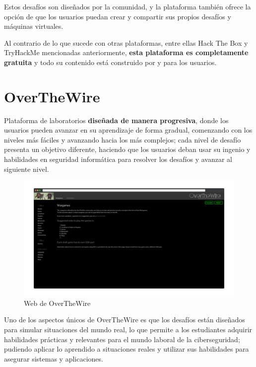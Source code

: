     Estos desafíos son diseñados por la comunidad, y la plataforma también ofrece la opción de que los usuarios puedan crear y compartir sus propios desafíos y máquinas virtuales.
    
    Al contrario de lo que sucede con otras plataformas, entre ellas Hack The Box y TryHackMe mencionadas anteriormente, \textbf{esta plataforma es completamente gratuita} y todo su contenido está construido por y para los usuarios.
    
    \newpage
    
    
    \section{OverTheWire}
    
    Plataforma de laboratorios \textbf{diseñada de manera progresiva}, donde los usuarios pueden avanzar en su aprendizaje de forma gradual, comenzando con los niveles más fáciles y avanzando hacia los más complejos; cada nivel de desafío presenta un objetivo diferente, haciendo que los usuarios deban usar su ingenio y habilidades en seguridad informática para resolver los desafíos y avanzar al siguiente nivel.
    
    \begin{figure}[h]
        \centering
        \includegraphics[width=\textwidth]{images/Capturas/Web de OverTheWire.png}
        \caption{Web de OverTheWire}
        \label{fig:OverTheWire-web}
    \end{figure}
    
    Uno de los aspectos únicos de OverTheWire es que los desafíos están diseñados para simular situaciones del mundo real, lo que permite a los estudiantes adquirir habilidades prácticas y relevantes para el mundo laboral de la ciberseguridad; pudiendo aplicar lo aprendido a situaciones reales y utilizar sus habilidades para asegurar sistemas y aplicaciones.
    

